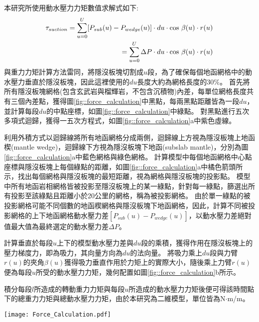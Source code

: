 本研究所使用動水壓力力矩數值求解式如下:
\begin{align}
    \tau_{suction} =  \sum ^U_{u=0} [P_{sub}(u)-P_{wedge}(u)]\cdot du \cdot {\rm cos}\ \beta(u)\cdot r(u)\\
    = \sum ^U_{u=0} \Delta P\cdot du \cdot {\rm cos}\ \beta(u)\cdot r(u)
    \label{eqn:tau_suction}
\end{align}
與重力力矩計算方法雷同，將隱沒板塊切割成$u$段，為了確保每個地函網格中的動水壓力垂直於隱沒板塊，因此這裡使用的$du$長度大約為網格長度的30$\%$。
首先將所有隱沒板塊網格(包含玄武岩與榴輝岩，不包含沉積物)內差，每單位網格長度共有三個內差點，獲得圖\ref{fig::force_calculation}中黑點，每兩黑點距離皆為一段$du$，並計算每段$du$的中點座標，如圖\ref{fig::force_calculation}中綠點。
對黑點進行五次多項式迴歸，獲得一五次方程式，如圖\ref{fig::force_calculation}a中紫色虛線。

利用外積方式以迴歸線將所有地函網格分成兩側，迴歸線上方視為隱沒板塊上地函楔(mantle wedge)，迴歸線下方視為隱沒板塊下地函(subslab mantle)，分別為圖\ref{fig::force_calculation}a中藍色網格與綠色網格。
計算模型中每個地函網格中心點座標與隱沒板塊上每個綠點的距離，如圖\ref{fig::force_calculation}a中橘色箭頭所示，找出每個網格與隱沒板塊的最短距離，視為網格與隱沒板塊的投影點。
模型中所有地函岩相網格皆被投影至隱沒板塊上的某一綠點，針對每一綠點，篩選出所有投影至該綠點且距離小於20公里的網格，稱為被投影網格。
由於單一綠點的被投影網格可能不同個數的地函楔網格與隱沒板塊下地函網格，因此，計算不同被投影網格的上下地函網格動水壓力差$[P_{sub}(u)-P_{wedge}(u)]$，以動水壓力差絕對值最大值為最終選定的動水壓力差$\Delta P$。%

計算垂直於每段$u$上下的模型動水壓力差與$du$段的乘積，獲得作用在隱沒板塊上的壓力梯度力，即為吸力，其向量方向為$du$的法向量。
將吸力乘上$du$段與力臂$r(u)$的夾角$\beta(u)$獲得吸力垂直作用於力矩上的實際大小，隨後乘上力臂$r(u)$便為每段$u$所受的動水壓力力矩，幾何配置如圖\ref{fig::force_calculation}b所示。

積分每段$l$所造成的轉動重力力矩與每段$u$所造成的動水壓力力矩後便可得該時間點下的總重力力矩與總動水壓力力矩，由於本研究為二維模型，單位皆為N$\cdot$m/m。

\begin{figure*}[ht!]
    \centering
    \texttt{[image: Force\_Calculation.pdf]}
    \caption[本研究計算動水壓力方法]{本研究計算動水壓力方法。
    (a)模型中網格示意圖。
    網格顏色代表不同岩相，藍色與綠色為地函、黃色為沉積物、橘色為隱沒板塊，其中隱沒板塊五次回歸多項式(紫色虛線)將地函網格區分成地函楔(藍色)與隱沒板塊下地函(綠色)。
    黑點為隱沒板塊內差值，綠點為每兩黑點間的中點，叉叉為地函楔其中一網格之中點座標，橘色箭頭為該網格與隱沒板塊上每個綠點的直線距離。
    (b)計算動水壓力力矩的幾何圖。
    夾角$\beta$為$du$與力臂$r(u)$的夾角。
    黑點為隱沒板塊內差值，綠點為兩黑點之中點，深藍點為海溝座標。吸力($F_{total}$)向量垂直作用於$du$，而其在力臂(moment arm, 綠色箭頭)上的最終作用力為橘色箭頭。
    }
    \label{fig::force_calculation}
\end{figure*}


